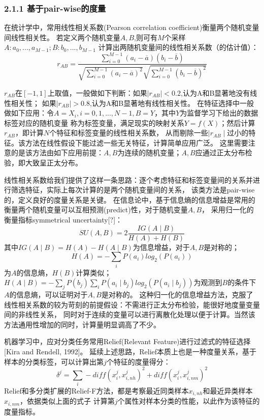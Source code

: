 \documentclass[a4paper,UTF8]{article}
\begin{document}
\subsubsection*{2.1.1 基于pair-wise的度量}

  在统计学中，常用线性相关系数(Pearson correlation coefficient)衡量两个随机变量间线性相关性。
  若定义两个随机变量$ A, B $,则可有$M$个采样$ A: a_{0},...,a_{M-1}; B: b_{0},...,b_{M-1}$
  计算出两随机变量间的线性相关系数（的估计值）：
  $$  r_{AB} = \frac{\sum_{i=0}^{M-1}(a_{i}-\overline{a})(b_{i}-\overline{b})}
  {\sqrt{\sum_{i=0}^{M-1}(a_{i}-\overline{a})^2}\sqrt{\sum_{i=0}^{M-1}(b_{i}-\overline{b})^2}}$$

  $ r_{AB} $在$ [-1,1]$上取值，一般做如下判断：如果$ \mid{r_{AB}}\mid<0.2$,认为A和B显著地没有线性相关性；
  如果$ \mid{r_{AB}}\mid>0.8$,认为A和B显著地有线性相关性。
  在特征选择中一般做如下应用：令$ A=X_{i},i=0,1,...,N-1, B=Y$，其中$Y$为监督学习下给出的数据标签对应的随机变量
  称为标签变量，满足现实的映射关系$Y=f(X)$；然后计算$ r_{AB} $，即计算$N$个特征和标签变量的线性相关系数，
  从而剔除一些$\mid{r_{AB}}\mid$过小的特征。该方法在线性假设下能过滤一些无关特征，计算简单应用广泛。
  这里需要注意的是该方法由如下应用前提：$A,B$为连续的随机变量；$A,B$应通过正太分布检验，即大致呈正太分布。

  线性相关系数给我们提供了这样一条思路：逐个考虑特征和标签变量间的关系并进行筛选特征，实际上每次计算的是两个随机变量间的关系，
  该类方法是pair-wise的，定义良好的度量关系是关键。
  在信息论中，基于信息熵的信息增益是常用的衡量两个随机变量可以互相预测(predict)性，对于随机变量$ A, B $，
  采用归一化的衡量指标symmetrical uncertainty[?]：
  $$SU(A, B) = 2 \frac{IG(A \mid B)}{H(A)+H(B)}$$
  其中$IG(A \mid B)=H(A)-H(A \mid B)$为信息增益，对于$A,B$是对称的；
  $$H(A)=-\sum_{i}P(a_{i})log_{2}(P(a_{i}))$$为$A$的信息熵，$H(B)$计算类似；
  $H(A \mid B)=-\sum_{j}P(b_{j})\sum_{i}P(a_{i} \mid b_{j})log_{2}(P(a_{i} \mid b_{j}))$为观测到$B$的条件下
  $A$的信息熵，可以证明对于$A,B$是对称的。
  这种归一化的信息增益方法，克服了线性相关系数的较为苛刻的前提假设：不需进行正太分布检验，能很好地度量变量间的非线性关系，
  同时对于连续的变量可以进行离散化处理以便于计算。当然该方法通用性增加的同时，计算量明显调高了不少。

  机器学习中，应对分类任务常用Relief(Relevant Feature)进行过滤式的特征选择[Kira and Rendell, 1992]。
  延续上述思路，Relief本质上也是一种度量关系，基于样本的分类标签，可以计算出第$j$个特征的度量得分：
  $$ \delta^{j}=\sum_{i}-diff(x_{i}^{j},x_{i,nh}^{j})^{2}+diff(x_{i}^{j},x_{i,nm}^{j})^{2} $$
  Relief和多分类扩展的Relief-F方法，都是考察最近同类样本$x_{i,nh}$和最近异类样本$x_{i,nm}$，依据类似上面的式子
  计算第$j$个属性对样本分类的性能，以此作为该特征的度量指标。
\end{document}
